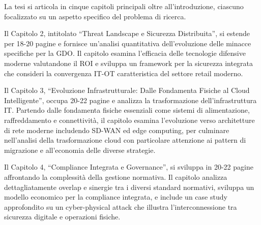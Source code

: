 \documentclass[12pt,a4paper,oneside]{book}
\numberwithin{figure}{chapter} %
\numberwithin{table}{chapter}  %
\begin{document}
La tesi si articola in cinque capitoli principali oltre
all'introduzione, ciascuno focalizzato su un aspetto specifico del
problema di ricerca.

Il Capitolo 2, intitolato ``Threat Landscape e Sicurezza Distribuita'',
si estende per 18-20 pagine e fornisce un'analisi quantitativa
dell'evoluzione delle minacce specifiche per la GDO. Il capitolo esamina
l'efficacia delle tecnologie difensive moderne valutandone il ROI e
sviluppa un framework per la sicurezza integrata che consideri la
convergenza IT-OT caratteristica del settore retail moderno.

Il Capitolo 3, ``Evoluzione Infrastrutturale: Dalle Fondamenta Fisiche
al Cloud Intelligente'', occupa 20-22 pagine e analizza la
trasformazione dell'infrastruttura IT. Partendo dalle fondamenta fisiche
essenziali come sistemi di alimentazione, raffreddamento e connettività,
il capitolo esamina l'evoluzione verso architetture di rete moderne
includendo SD-WAN ed edge computing, per culminare nell'analisi della
trasformazione cloud con particolare attenzione ai pattern di migrazione
e all'economia delle diverse strategie.

Il Capitolo 4, ``Compliance Integrata e Governance'', si sviluppa in
20-22 pagine affrontando la complessità della gestione normativa. Il
capitolo analizza dettagliatamente overlap e sinergie tra i diversi
standard normativi, sviluppa un modello economico per la compliance
integrata, e include un case study approfondito su un cyber-physical
attack che illustra l'interconnessione tra sicurezza digitale e
operazioni fisiche.
\end{document}
